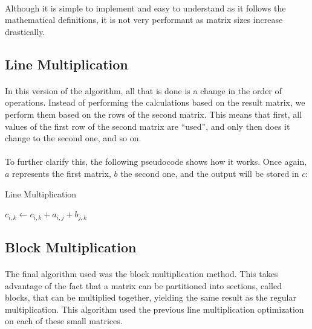 \documentclass[11pt]{report}
\begin{document}
    \paragraph{}Although it is simple to implement and easy to understand as it follows the mathematical definitions, it is not very performant as matrix sizes increase drastically.

    \subsection*{Line Multiplication}

    \paragraph{}In this version of the algorithm, all that is done is a change in the order of operations. Instead of performing the calculations based on the result matrix, we perform them based on the rows of the second matrix. This means that first, all values of the first row of the second matrix are ``used'', and only then does it change to the second one, and so on.

    \newpage

    \paragraph{}To further clarify this, the following pseudocode shows how it works. Once again, $a$ represents the first matrix, $b$ the second one, and the output will be stored in $c$:

    \begin{algorithm}
      \caption{Line Multiplication}\label{euclid}
      \begin{algorithmic}[1]
        \State $c_{i, k} \leftarrow c_{i, k} + a_{i, j} + b_{j, k}$
        \EndFor
        \EndFor
        \EndFor
        \EndProcedure
      \end{algorithmic}
    \end{algorithm}

    \subsection*{Block Multiplication}

    \paragraph{}The final algorithm used was the block multiplication method. This takes advantage of the fact that a matrix can be partitioned into sections, called blocks, that can be multiplied together, yielding the same result as the regular multiplication. This algorithm used the previous line multiplication optimization on each of these small matrices.
\end{document}
